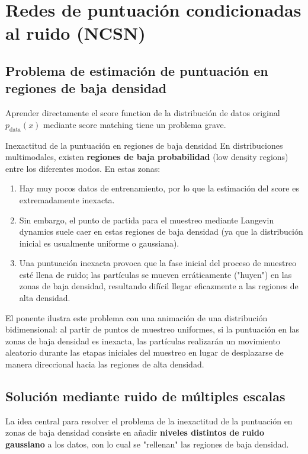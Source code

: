 \section{Redes de puntuación condicionadas al ruido (NCSN)}

\subsection{Problema de estimación de puntuación en regiones de baja densidad}

Aprender directamente el score function de la distribución de datos original $p_{\text{data}}(x)$ mediante score matching tiene un problema grave.

\begin{warningbox}{Inexactitud de la puntuación en regiones de baja densidad}
En distribuciones multimodales, existen \textbf{regiones de baja probabilidad} (low density regions) entre los diferentes modos. En estas zonas:
\begin{enumerate}
    \item Hay muy pocos datos de entrenamiento, por lo que la estimación del score es extremadamente inexacta.
    \item Sin embargo, el punto de partida para el muestreo mediante Langevin dynamics suele caer en estas regiones de baja densidad (ya que la distribución inicial es usualmente uniforme o gaussiana).
    \item Una puntuación inexacta provoca que la fase inicial del proceso de muestreo esté llena de ruido; las partículas se mueven erráticamente ("huyen") en las zonas de baja densidad, resultando difícil llegar eficazmente a las regiones de alta densidad.
\end{enumerate}
\end{warningbox}

El ponente ilustra este problema con una animación de una distribución bidimensional: al partir de puntos de muestreo uniformes, si la puntuación en las zonas de baja densidad es inexacta, las partículas realizarán un movimiento aleatorio durante las etapas iniciales del muestreo en lugar de desplazarse de manera direccional hacia las regiones de alta densidad.

\subsection{Solución mediante ruido de múltiples escalas}

La idea central para resolver el problema de la inexactitud de la puntuación en zonas de baja densidad consiste en añadir \textbf{niveles distintos de ruido gaussiano} a los datos, con lo cual se "rellenan" las regiones de baja densidad.

